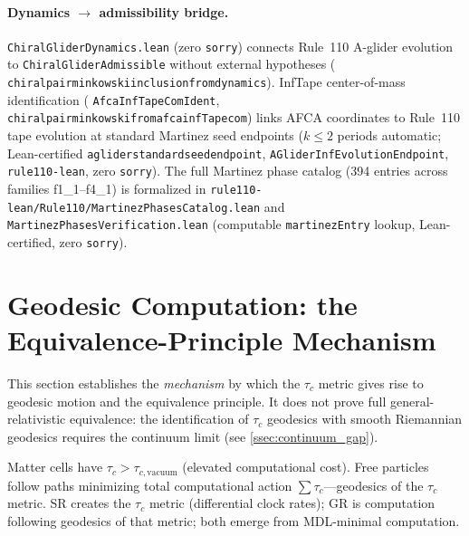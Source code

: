 \documentclass[11pt]{article}
\theoremstyle{remark}
\newcommand{\lean}[1]{%
  \penalty-100
  \begingroup\def\_{\textunderscore\allowbreak}\texttt{#1}\endgroup}
\begin{document}
\paragraph{Dynamics $\to$ admissibility bridge.}
\lean{ChiralGliderDynamics.lean} (zero \texttt{sorry}) connects Rule~110
A-glider evolution to \lean{ChiralGliderAdmissible} without external
hypotheses (\lean{chiral\_pair\_minkowski\_inclusion\_from\_dynamics}).
InfTape center-of-mass identification (\lean{AfcaInfTapeComIdent},
\lean{chiral\_pair\_minkowski\_from\_afca\_infTape\_com}) links AFCA
coordinates to Rule~110 tape evolution at standard Martinez seed endpoints
($k \leq 2$ periods automatic;
Lean-certified \lean{a\_glider\_standard\_seed\_endpoint},
\lean{AGliderInfEvolutionEndpoint}, \texttt{rule110-lean},
zero \texttt{sorry}).
The full Martinez phase catalog (394 entries across families f1\_1--f4\_1)
is formalized in \texttt{rule110-lean/Rule110/MartinezPhasesCatalog.lean}
and \texttt{MartinezPhasesVerification.lean}
(computable \texttt{martinezEntry} lookup, Lean-certified, zero \texttt{sorry}).

\section{Geodesic Computation: the Equivalence-Principle Mechanism}
\label{sec:geodesic_computation}

This section establishes the \emph{mechanism} by which the $\tau_c$ metric
gives rise to geodesic motion and the equivalence principle.
It does not prove full general-relativistic equivalence: the identification
of $\tau_c$ geodesics with smooth Riemannian geodesics requires the continuum
limit (see \cref{ssec:continuum_gap}).

Matter cells have $\tau_c > \tau_{c,\mathrm{vacuum}}$ (elevated computational
cost).
Free particles follow paths minimizing total computational action
$\sum \tau_c$---geodesics of the $\tau_c$ metric.
SR creates the $\tau_c$ metric (differential clock rates); GR is computation
following geodesics of that metric; both emerge from MDL-minimal computation.
\end{document}
